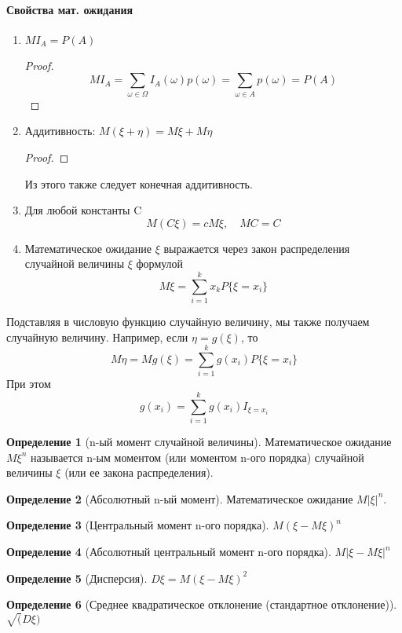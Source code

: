 \documentclass[a4paper]{article}
\theoremstyle{definition}
\newtheorem*{definition}{Определение}
\theoremstyle{remark}
\begin{document}
\paragraph*{Свойства мат. ожидания}
\begin{enumerate}
    \item $M I_A = P(A)$
    \begin{proof}
    \[M I_A = \sum_{\omega \in \Omega} I_A(\omega) p (\omega) = \sum_{\omega \in A} p(\omega)  = P(A)\]
    \end{proof}
    \item Аддитивность: $M(\xi + \eta) = M\xi + M\eta$
    \begin{proof}
        
    \end{proof}
    Из этого также следует конечная аддитивность.
    \item Для любой константы C \[M(C\xi) = cM\xi,\quad MC = C\]
    \item Математическое ожидание $\xi$ выражается через закон распределения случайной величины $\xi$ формулой
    \[M\xi = \sum_{i = 1}^k x_k P \{\xi = x_i\}\]
\end{enumerate}
Подставляя в числовую функцию случайную величину, мы также получаем случайную величину. Например, если $\eta = g(\xi)$, то \[M\eta  = M g(\xi)  = \sum_{i = 1}^k g(x_i) P\{\xi = x_i\}\]
При этом \[g(x_i) = \sum_{i = 1}^k g(x_i) I_{\xi = x_i}\]
\begin{definition}[n-ый момент случайной величины]
    Математическое ожидание $M\xi^n$ называется n-ым моментом (или моментом n-ого порядка) случайной величины $\xi$ (или ее закона распределения).
\end{definition}
\begin{definition}[Абсолютный n-ый момент]
    Математическое ожидание $M {|\xi|}^n$.
\end{definition}
\begin{definition}[Центральный момент n-ого порядка]
    $M(\xi-M\xi)^n$
\end{definition}
\begin{definition}[Абсолютный центральный момент n-ого порядка]
    $M|\xi-M\xi|^n$
\end{definition}
\begin{definition}[Дисперсия]
    $D\xi = M(\xi - M\xi)^2$
\end{definition}
\begin{definition}[Среднее квадратическое отклонение (стандартное отклонение)]
    $\sqrt(D\xi)$
\end{definition}
\end{document}
